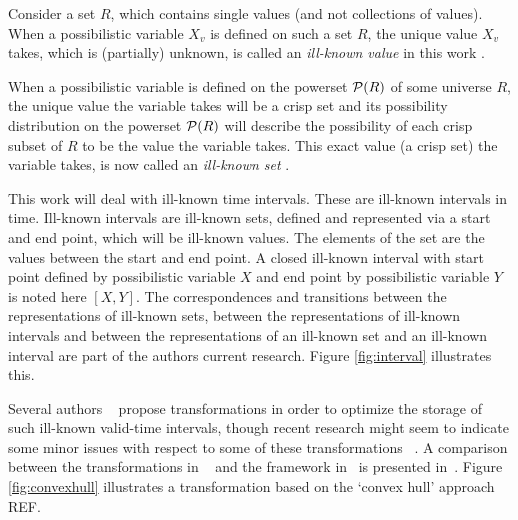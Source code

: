 Consider a set $R$, which contains single values (and not collections of values). When a possibilistic variable $X_{v}$ is defined on such a set $R$, the unique value $X_{v}$ takes, which is (partially) unknown, is called an \emph{ill-known value} in this work \cite{Dubois88b}.



When a possibilistic variable is defined on the powerset $\mathcal{P}(R)$ of some universe $R$, the unique value the variable takes will be a crisp set and its possibility distribution on the powerset $\mathcal{P}(R)$ will describe the possibility of each crisp subset of $R$ to be the value the variable takes. This exact value (a crisp set) the variable takes, is now called an \emph{ill-known set} \cite{Dubois88b}.

This work will deal with ill-known time intervals. These are ill-known intervals in time. Ill-known intervals are ill-known sets, defined and represented via a start and end point, which will be ill-known values. The elements of the set are the values between the start and end point. A closed ill-known interval with start point defined by possibilistic variable $X$ and end point by possibilistic variable $Y$ is noted here $\left[X, Y\right]$. The correspondences and transitions between the representations of ill-known sets, between the representations of ill-known intervals and between the representations of an ill-known set and an ill-known interval are part of the authors current research. Figure \ref{fig:interval} illustrates this.


Several authors ~\cite{garrido2009} propose transformations in order to optimize the storage of such ill-known valid-time intervals, though recent research might seem to indicate some minor issues with respect to some of these transformations ~\cite{Pon11}. A comparison between the transformations in ~\cite{garrido2009} and the framework in~\cite{Pon11} is presented in~\cite{pon12}. Figure \ref{fig:convexhull} illustrates a transformation based on the `convex hull' approach REF.



